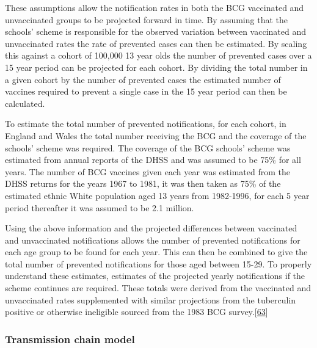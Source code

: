 \documentclass[11pt,twoside]{bristolthesis}
\begin{document}
  These assumptions allow the notification rates in both the BCG vaccinated and unvaccinated groups to be projected forward in time. By assuming that the schools' scheme is responsible for the observed variation between vaccinated and unvaccinated rates the rate of prevented cases can then be estimated. By scaling this against a cohort of 100,000 13 year olds the number of prevented cases over a 15 year period can be projected for each cohort. By dividing the total number in a given cohort by the number of prevented cases the estimated number of vaccines required to prevent a single case in the 15 year period can then be calculated.
  
  To estimate the total number of prevented notifications, for each cohort, in England and Wales the total number receiving the BCG and the coverage of the schools' scheme was required. The coverage of the BCG schools' scheme was estimated from annual reports of the DHSS and was assumed to be 75\% for all years. The number of BCG vaccines given each year was estimated from the DHSS returns for the years 1967 to 1981, it was then taken as 75\% of the estimated ethnic White population aged 13 years from 1982-1996, for each 5 year period thereafter it was assumed to be 2.1 million.
  
  Using the above information and the projected differences between vaccinated and unvaccinated notifications allows the number of prevented notifications for each age group to be found for each year. This can then be combined to give the total number of prevented notifications for those aged between 15-29. To properly understand these estimates, estimates of the projected yearly notifications if the scheme continues are required. These totals were derived from the vaccinated and unvaccinated rates supplemented with similar projections from the tuberculin positive or otherwise ineligible sourced from the 1983 BCG survey.{[}\protect\hyperlink{ref-Sutherland1987a}{63}{]}
  
  \hypertarget{transmission-chain-model}{%
  \subsubsection{Transmission chain model}\label{transmission-chain-model}}
  
\end{document}
